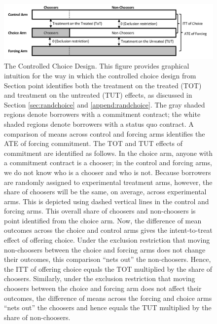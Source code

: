 \documentclass[ecta,nameyear,final]{econsocart}
\begin{document}
\begin{figure}
    \begin{center}
        \centering
        \includegraphics[width=1.0\textwidth]{Figuras/tot_tut_intuition.png}
    \end{center}
 \caption{The Controlled Choice Design.   This figure provides graphical intuition for the way in which the controlled choice design from Section point identifies both the treatment on the treated (TOT) and treatment on the untreated (TUT) effects, as discussed in Section \ref{sec:randchoice} and \ref{append:randchoice}. 
    The gray shaded regions denote borrowers with a commitment contract; the white shaded regions denote borrowers with a status quo contract.
    A comparison of means across control and forcing arms identifies the ATE of forcing  commitment.
    The TOT and TUT effects of commitment are identified as follows.
    In the choice arm, anyone with a commitment contract is a chooser; in the control and forcing arms, we do not know who is a chooser and who is not.
    Because borrowers are randomly assigned to experimental treatment arms, however, the share of choosers will be the same, on average, across experimental arms.
    This is depicted using dashed vertical lines in the control and forcing arms.
    This overall share of choosers and non-choosers is point identified from the choice arm.
    Now, the difference of mean outcomes across the choice and control arms gives the intent-to-treat effect of offering choice.
    Under the exclusion restriction that moving non-choosers between the choice and forcing arms does not change their outcomes, this comparison ``nets out'' the non-choosers.
    Hence, the ITT of offering choice equals the TOT multiplied by the share of choosers. 
    Similarly, under the exclusion restriction that moving choosers between the choice and forcing arm does not affect their outcomes, the difference of means across the forcing and choice arms ``nets out'' the choosers and hence equals the TUT multiplied by the share of non-choosers.}
    \label{tot_tut_graph}
\end{figure}   
\end{document}
